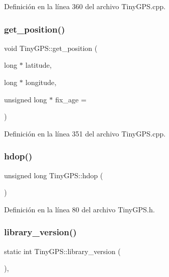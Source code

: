 Definición en la línea 360 del archivo Tiny\+G\+P\+S.\+cpp.

\mbox{\label{class_tiny_g_p_s_a70ba85cc7d84a915b6b1c379471e862b}} 
\subsubsection{\texorpdfstring{get\+\_\+position()}{get\_position()}}
{\footnotesize\ttfamily void Tiny\+G\+P\+S\+::get\+\_\+position (\begin{DoxyParamCaption}\item[{long $\ast$}]{latitude,  }\item[{long $\ast$}]{longitude,  }\item[{unsigned long $\ast$}]{fix\+\_\+age = {} }\end{DoxyParamCaption})}



Definición en la línea 351 del archivo Tiny\+G\+P\+S.\+cpp.

\mbox{\label{class_tiny_g_p_s_aa8777e03607e275ab8d80f37f08f25ff}} 
\subsubsection{\texorpdfstring{hdop()}{hdop()}}
{\footnotesize\ttfamily unsigned long Tiny\+G\+P\+S\+::hdop (\begin{DoxyParamCaption}{ }\end{DoxyParamCaption})\hspace{0.3cm}{\ttfamily [inline]}}



Definición en la línea 80 del archivo Tiny\+G\+P\+S.\+h.

\mbox{\label{class_tiny_g_p_s_a50ef8dcc83a2f05ad9f1a64f5f2495be}} 
\subsubsection{\texorpdfstring{library\+\_\+version()}{library\_version()}}
{\footnotesize\ttfamily static int Tiny\+G\+P\+S\+::library\+\_\+version (\begin{DoxyParamCaption}{ }\end{DoxyParamCaption})\hspace{0.3cm}{\ttfamily [inline]}, {\ttfamily [static]}}



